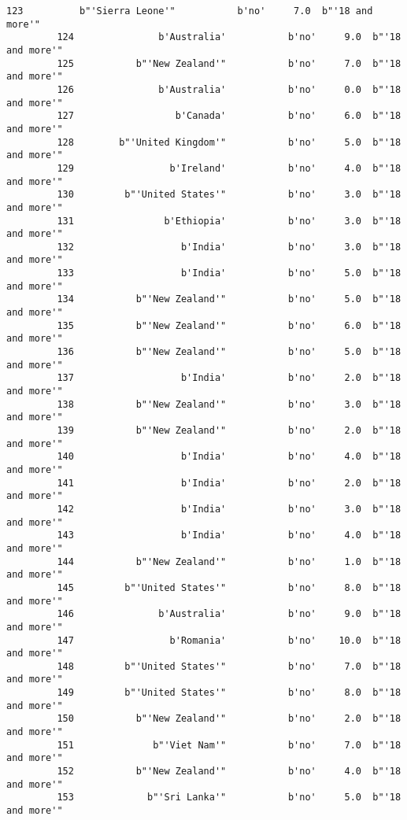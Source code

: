\documentclass[11pt]{article}
\begin{document}
\begin{Verbatim}[commandchars=\\\{\}]
         123          b"'Sierra Leone'"           b'no'     7.0  b"'18 and more'"   
         124               b'Australia'           b'no'     9.0  b"'18 and more'"   
         125           b"'New Zealand'"           b'no'     7.0  b"'18 and more'"   
         126               b'Australia'           b'no'     0.0  b"'18 and more'"   
         127                  b'Canada'           b'no'     6.0  b"'18 and more'"   
         128        b"'United Kingdom'"           b'no'     5.0  b"'18 and more'"   
         129                 b'Ireland'           b'no'     4.0  b"'18 and more'"   
         130         b"'United States'"           b'no'     3.0  b"'18 and more'"   
         131                b'Ethiopia'           b'no'     3.0  b"'18 and more'"   
         132                   b'India'           b'no'     3.0  b"'18 and more'"   
         133                   b'India'           b'no'     5.0  b"'18 and more'"   
         134           b"'New Zealand'"           b'no'     5.0  b"'18 and more'"   
         135           b"'New Zealand'"           b'no'     6.0  b"'18 and more'"   
         136           b"'New Zealand'"           b'no'     5.0  b"'18 and more'"   
         137                   b'India'           b'no'     2.0  b"'18 and more'"   
         138           b"'New Zealand'"           b'no'     3.0  b"'18 and more'"   
         139           b"'New Zealand'"           b'no'     2.0  b"'18 and more'"   
         140                   b'India'           b'no'     4.0  b"'18 and more'"   
         141                   b'India'           b'no'     2.0  b"'18 and more'"   
         142                   b'India'           b'no'     3.0  b"'18 and more'"   
         143                   b'India'           b'no'     4.0  b"'18 and more'"   
         144           b"'New Zealand'"           b'no'     1.0  b"'18 and more'"   
         145         b"'United States'"           b'no'     8.0  b"'18 and more'"   
         146               b'Australia'           b'no'     9.0  b"'18 and more'"   
         147                 b'Romania'           b'no'    10.0  b"'18 and more'"   
         148         b"'United States'"           b'no'     7.0  b"'18 and more'"   
         149         b"'United States'"           b'no'     8.0  b"'18 and more'"   
         150           b"'New Zealand'"           b'no'     2.0  b"'18 and more'"   
         151              b"'Viet Nam'"           b'no'     7.0  b"'18 and more'"   
         152           b"'New Zealand'"           b'no'     4.0  b"'18 and more'"   
         153             b"'Sri Lanka'"           b'no'     5.0  b"'18 and more'"   

\end{Verbatim}
\end{document}
